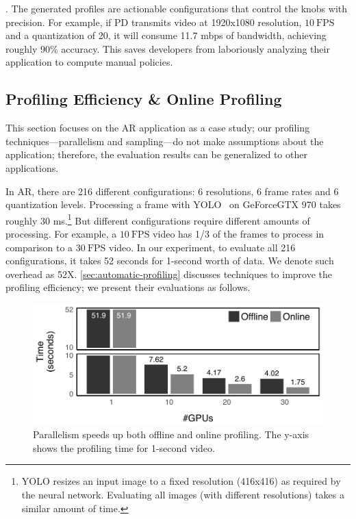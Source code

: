 . The generated profiles are actionable
configurations that control the knobs with precision. For example,
if PD transmits video at 1920x1080 resolution, \(10~\text{FPS}\) and
a quantization of 20, it will consume 11.7 mbps of bandwidth, achieving roughly
90\% accuracy. This saves developers from laboriously analyzing their
application to compute manual policies.

\subsection{Profiling Efficiency \& Online Profiling}
\label{sec:online-profiling}

This section focuses on the AR application as a case study; our profiling
techniques---parallelism and sampling---do not make assumptions about the
application; therefore, the evaluation results can be generalized to other
applications.

In AR, there are 216 different configurations: 6 resolutions, 6 frame rates and
6 quantization levels. Processing a frame with YOLO~\cite{redmon2016yolo9000} on
GeForce\textregistered\space GTX 970 takes roughly 30 ms.\footnote{YOLO resizes
  an input image to a fixed resolution (416x416) as required by the neural
  network. Evaluating all images (with different resolutions) takes a similar
  amount of time.} But different configurations require different amounts of
processing. For example, a \(10~\text{FPS}\) video has 1/3 of the frames to
process in comparison to a \(30~\text{FPS}\) video.  In our experiment, to
evaluate all 216 configurations, it takes 52 seconds for 1-second worth of
data. We denote such overhead as 52X\@. \autoref{sec:automatic-profiling}
discusses techniques to improve the profiling efficiency; we present their
evaluations as follows.

\begin{figure}
  \centering
  \includegraphics[width=1.0\columnwidth]{figures/parallel.pdf}
  \caption{Parallelism speeds up both offline and online profiling.
  The y-axis shows the profiling time for 1-second video.}
  \label{fig:parallel}
\end{figure}

